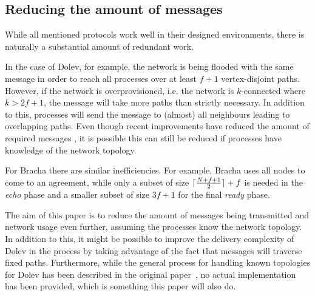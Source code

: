 \subsection*{Reducing the amount of messages}
While all mentioned protocols work well in their designed environments, there is naturally a substantial amount of redundant work.

In the case of Dolev, for example, the network is being flooded with the same message in order to reach all processes over at least $f+1$ vertex-disjoint paths. However, if the network is overprovisioned, i.e. the network is $k$-connected where $k > 2f+1$, the message will take more paths than strictly necessary. In addition to this, processes will send the message to (almost) all neighbours leading to overlapping paths. Even though recent improvements have reduced the amount of required messages 
, it is possible this can still be reduced if processes have knowledge of the network topology.

For Bracha there are similar inefficiencies. For example, Bracha uses all nodes to come to an agreement, while only a subset of size $\lceil\frac{N+f+1}{2}\rceil + f$ is needed in the \textit{echo} phase and a smaller subset of size $3f+1$ for the final \textit{ready} phase.


The aim of this paper is to reduce the amount of messages being transmitted and network usage even further, assuming the processes know the network topology. In addition to this, it might be possible to improve the delivery complexity of Dolev in the process by taking advantage of the fact that messages will traverse fixed paths. Furthermore, while the general process for handling known topologies for Dolev has been described in the original paper~\cite{dolev}, no actual implementation has been provided, which is something this paper will also do.